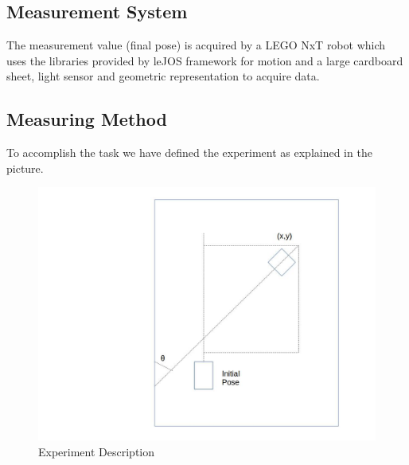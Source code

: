 \documentclass[10pt]{scrartcl}
\begin{document}
\subsection*{Measurement System}

The measurement value (final pose) is acquired by a LEGO NxT robot which uses the libraries provided by leJOS framework for motion and a large cardboard sheet, light sensor and geometric representation to acquire data. 

\subsection*{Measuring Method}

To accomplish the task we have defined the experiment as explained in the picture.\\

\begin{figure}[h!]
\centering
\includegraphics[trim=200 0 0 0, scale=0.35]{images/image}
\caption{Experiment Description}
\label{fig:3}
\end{figure}
\end{document}
